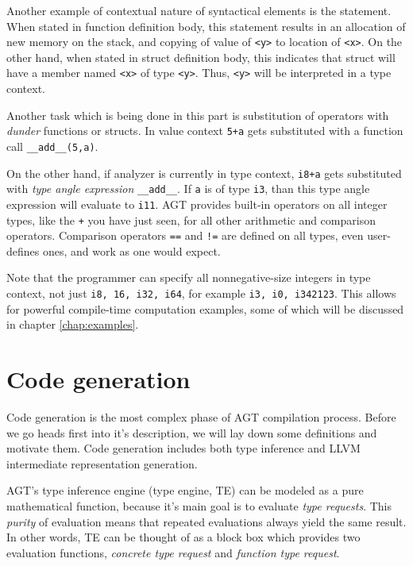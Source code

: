 \documentclass[times, utf8, diplomski]{fer}
\theoremstyle{definition}
\newcommand{\pythoncode}[3]{
    
}
\begin{document}
\pythoncode{\resdir/compiler/initex.py}{semana}{a}

Another example of contextual nature of syntactical elements is the  statement.
When stated in function definition body, this statement results in an allocation 
of new memory on the stack,
and copying of value of \texttt{<y>} to location of \texttt{<x>}.
On the other hand, when stated in struct definition body, this indicates that
struct will have a member named \texttt{<x>} of type \texttt{<y>}. 
Thus, \texttt{<y>} will be interpreted in a type context.

Another task which is being done in this part is substitution of operators with 
\textit{dunder} functions or structs. In value context \texttt{5+a} gets
substituted with a function call \texttt{\_\_add\_\_(5,a)}. 

On the other hand,
if analyzer is currently in type context, \texttt{i8+a} gets substituted with
\textit{type angle expression} \texttt{\_\_add\_\_<i8, a>}. If \texttt{a} is of type \texttt{i3},
than this type angle expression will evaluate to \texttt{i11}. AGT provides built-in operators
on all integer types, like the \texttt{+} you have just seen, for all other arithmetic and
comparison operators. Comparison operators \texttt{==} and \texttt{!=} are defined on all types, 
even user-defines ones, and work as one would expect.

Note that the programmer can specify all nonnegative-size 
integers in type context, not just \texttt{i8, 16, i32, i64},
for example \texttt{i3, i0, i342123}.
This allows for powerful compile-time computation examples, 
some of which will be discussed in chapter \ref{chap:examples}.


\section{Code generation}\label{sect:codegen}

Code generation is the most complex phase of AGT compilation process.
Before we go heads first into it's description, we will lay down some definitions
and motivate them. Code generation includes both type inference and LLVM intermediate representation
generation. 

AGT's type inference engine (type engine, TE) can be modeled as a 
pure mathematical function, because it's main goal is to evaluate \textit{type requests}.
This \textit{purity} of evaluation means that repeated evaluations always yield the same result.
In other words, TE can be thought of as a block box which provides two evaluation functions,
\textit{concrete type request} and \textit{function type request}.
\end{document}
